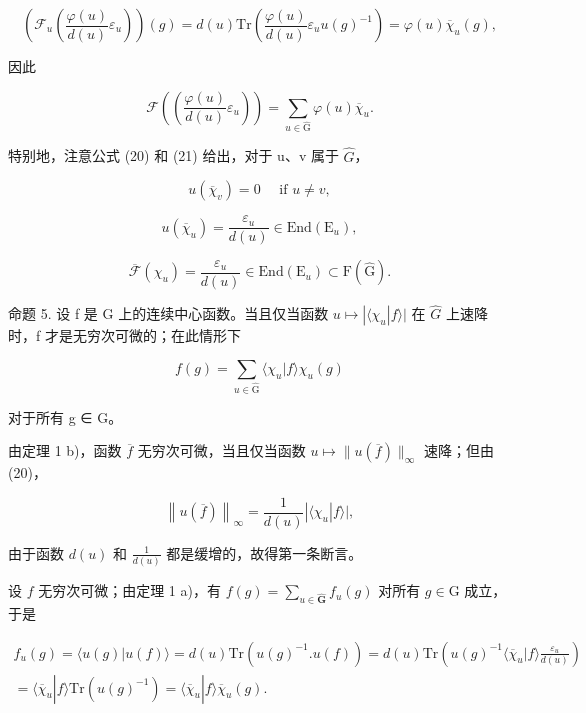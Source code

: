 \[
\left(\mathcal {F} _ {u} \left(\frac {\varphi (u)}{d (u)} \varepsilon_ {u}\right)\right) (g) = d (u) \mathrm{Tr} \left(\frac {\varphi (u)}{d (u)} \varepsilon_ {u} u (g) ^ {- 1}\right) = \varphi (u) \overline {{\chi}} _ {u} (g),
\]

因此

\[
\mathcal {F} \left(\left(\frac {\varphi (u)}{d (u)} \varepsilon_ {u}\right)\right) = \sum_ {u \in \hat {\mathrm{G}}} \varphi (u) \overline {{\chi}} _ {u}.\tag{22}
\]

特别地，注意公式 (20) 和 (21) 给出，对于 u、v 属于 \(\hat{G}\)，

\[
u (\overline {{\chi}} _ {v}) = 0 \quad \text { if } u \neq v,\tag{23}
\]

\[
u (\overline {{\chi}} _ {u}) = \frac {\varepsilon_ {u}}{d (u)} \in \mathrm{End} (\mathrm{E} _ {u}),\tag{24}
\]

\[
\overline {{\mathcal {F}}} (\chi_ {u}) = \frac {\varepsilon_ {u}}{d (u)} \in \mathrm{End} (\mathrm{E} _ {u}) \subset \mathrm{F} (\hat {\mathrm{G}}).\tag{25}
\]

命题 5. 设 f 是 G 上的连续中心函数。当且仅当函数 \(u \mapsto |\langle \chi_{u}|f\rangle|\) 在 \(\hat{G}\) 上速降时，f 才是无穷次可微的；在此情形下

\[
f (g) = \sum_ {u \in \hat {\mathrm{G}}} \langle \chi_ {u} | f \rangle \chi_ {u} (g)
\]

对于所有 g ∈ G。

由定理 1 b)，函数 \(\overline{f}\) 无穷次可微，当且仅当函数 \(u \mapsto \| u(\overline{f})\|_{\infty}\) 速降；但由 (20)，

\[
\left\| u (\overline {{f}}) \right\| _ {\infty} = \frac {1}{d (u)} | \langle \chi_ {u} | f \rangle |,
\]

由于函数 \(d(u)\) 和 \(\frac{1}{d(u)}\) 都是缓增的，故得第一条断言。

设 \(f\) 无穷次可微；由定理 1 a)，有 \(f(g) = \sum_{u\in \hat{\mathbf{G}}}f_u(g)\) 对所有 \(g\in \mathrm{G}\) 成立，于是

\[
\begin{array}{c} f _ {u} (g) = \langle u (g) | u (f) \rangle = d (u) \mathrm{Tr} (u (g) ^ {- 1}. u (f)) = d (u) \mathrm{Tr} \left(u (g) ^ {- 1} \langle \overline {{\chi}} _ {u} | f \rangle \frac {\varepsilon_ {u}}{d (u)}\right) \\ = \langle \overline {{\chi}} _ {u} | f \rangle \mathrm{Tr} (u (g) ^ {- 1}) = \langle \overline {{\chi}} _ {u} | f \rangle \overline {{\chi}} _ {u} (g). \end{array}
\]

